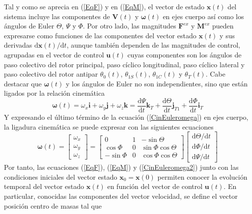 Tal y como se aprecia en (\ref{EqF}) y en (\ref{EqM}), el vector de estado $\mathrm{\textbf{x}}(t)$ del sistema incluye las componentes de $\mathrm{\textbf{V}}(t)$ y $\boldsymbol{\omega}(t)$
en ejes cuerpo así como los ángulos de Euler $\Theta$, $\Psi$ y $\Phi$. Por otro lado, las magnitudes $\mathrm{\textbf{F}}^{ex}$ y $\mathrm{\textbf{M}}^{ex}$ pueden expresarse como funciones de las componentes del vector estado $\mathrm{\textbf{x}}(t)$ y sus derivadas $\mathrm{d\textbf{x}}(t)/\mathrm{d}t$, aunque también dependen de las magnitudes de control, agrupadas en el vector de control $\mathrm{\textbf{u}}(t)$ cuyas componentes son los ángulos de paso colectivo del rotor principal, paso cíclico longitudinal, paso cíclico lateral y paso colectivo del rotor antipar $\theta_0(t)$, $\theta_{1S}(t)$, $\theta_{1C}(t)$ y $\theta_T(t)$.
Cabe destacar que $\boldsymbol{\omega}(t)$ y los ángulos de Euler no son independientes, sino que están ligados por la relación cinemática
\begin{equation}
	\boldsymbol{\omega}(t)=\omega_x\textbf{i}+\omega_y\textbf{j}+\omega_z\textbf{k}=\frac{\mathrm{d}\Psi}{\mathrm{d}t}\textbf{k}_T+\frac{\mathrm{d}\Theta}{\mathrm{d}t}\textbf{j}_{T1}+\frac{\mathrm{d}\Phi}{\mathrm{d}t}\textbf{i}_T
	\label{CinEuleromega}
\end{equation}
Y expresando el último término de la ecuación (\ref{CinEuleromega}) en ejes cuerpo, la ligadura cinemática se puede expresar con las siguientes ecuaciones
\begin{equation}
	\boldsymbol{\omega}(t)=\left[
	\begin{array}{c}
	\omega_x\\
	\omega_y\\
	\omega_z
	\end{array}
	\right]=\left[	
	\begin{array}{ccc}
	0 & 1 & -\sin\Theta\\
	\cos\Phi & 0 & \sin\Phi\cos\Theta\\
	-\sin\Phi & 0 & \cos\Phi\cos\Theta
	\end{array}
	\right]\left[
	\begin{array}{c}
	\mathrm{d}\Theta/\mathrm{d}t\\
	\mathrm{d}\Phi/\mathrm{d}t\\
	\mathrm{d}\Psi/\mathrm{d}t
	\end{array}
	\right]
	\label{CinEuleromega2}
\end{equation}
Por tanto, las ecuaciones (\ref{EqF}), (\ref{EqM}) y (\ref{CinEuleromega2}) junto con las condiciones iniciales del vector estado $\mathrm{\textbf{x}_0}=\mathrm{\textbf{x}(0)}$ permiten conocer la evolución temporal del vector estado $\mathrm{\textbf{x}}(t)$ en función del vector de control $\mathrm{\textbf{u}}(t)$. En particular, conocidas las componentes del vector velocidad, se define el vector posición centro de masas tal que 
